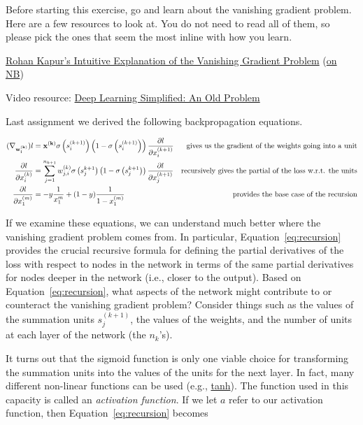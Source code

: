 \documentclass[assignment07_Solutions]{subfiles}
\begin{document}
\begin{exercise}
Before starting this exercise, go and learn about the vanishing gradient problem.  Here are a few resources to look at.  You do not need to read all of them, so please pick the ones that seem the most inline with how you learn.
\begin{externalresources}
\bi
\item \href{https://ayearofai.com/rohan-4-the-vanishing-gradient-problem-ec68f76ffb9b}{Rohan Kapur's Intuitive Explanation of the Vanishing Gradient Problem} (\href{http://nb.mit.edu/f/55483}{on NB})
\item Video resource: \href{https://www.youtube.com/watch?v=SKMpmAOUa2Q}{Deep Learning Simplified: An Old Problem}
\ei
\end{externalresources}


Last assignment we derived the following backpropagation equations.

\begin{align}
(\nabla_{\mathbf{w^{(k)}_i}}) l &= \mathbf{x^{(k)}} \sigma\left (s_i^{(k+1)} \right )\left (1-\sigma\left (s_i^{(k+1)} \right )\right) \frac{\partial l}{\partial x_i^{(k+1)}} & \mbox{gives us the gradient of the weights going into a unit} \\
\frac{\partial l}{\partial x^{(k)}_i} &= \sum_{j=1}^{n_{k+1}} w^{(k)}_{j,i} \sigma \left ( s_{j}^{k+1} \right) \left (1-\sigma \left ( s_{j}^{k+1} \right)\right) \frac{\partial l}{\partial x^{(k+1)}_j} \label{eq:recursion} & \mbox{recursively gives the partial of the loss w.r.t. the units} \\
\frac{\partial l}{\partial x^{(m)}_1} &= -y\frac{1}{x_1^{m}} + (1-y) \frac{1}{1-x_1^{(m)}} & \mbox{provides the base case of the recursion}
\end{align}

\bes
\item If we examine these equations, we can understand much better where the vanishing gradient problem comes from.  In particular, Equation~\ref{eq:recursion} provides the crucial recursive formula for defining the partial derivatives of the loss with respect to nodes in the network in terms of the same partial derivatives for nodes deeper in the network (i.e., closer to the output).  Based on Equation~\ref{eq:recursion}, what aspects of the network might contribute to or counteract the vanishing gradient problem? Consider things such as the values of the summation units $s_j^{(k+1)}$, the values of the weights, and the number of units at each layer of the network (the $n_k$'s).
\item It turns out that the sigmoid function is only one viable choice for transforming the summation units into the values of the units for the next layer.  In fact, many different  non-linear functions can be used (e.g., \href{http://mathworld.wolfram.com/HyperbolicTangent.html}{tanh}).  The function used in this capacity is called an \emph{activation function}.  If we let $a$ refer to our activation function, then Equation~\ref{eq:recursion} becomes


\end{exercise}
\end{document}
